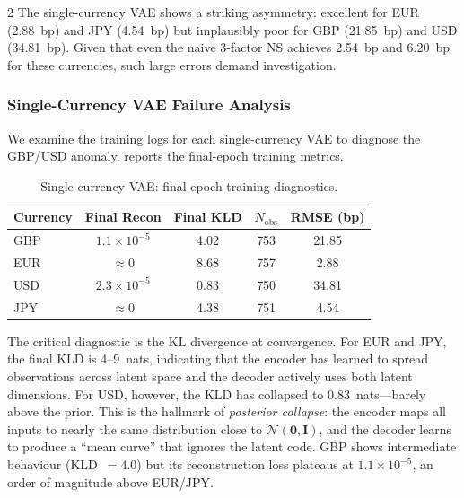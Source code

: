 \documentclass[10pt,a4paper]{article}
\theoremstyle{plain}
\theoremstyle{definition}
\begin{document}
\begin{multicols}{2}
The single-currency VAE shows a striking asymmetry: excellent for EUR (2.88~bp) and JPY (4.54~bp) but implausibly poor for GBP (21.85~bp) and USD (34.81~bp). Given that even the naive 3-factor NS achieves 2.54~bp and 6.20~bp for these currencies, such large errors demand investigation.

\subsubsection{Single-Currency VAE Failure Analysis}\label{sec:sc_failure}

We examine the training logs for each single-currency VAE to diagnose the GBP/USD anomaly.  reports the final-epoch training metrics.

\begin{table}[H]
\centering
\caption{Single-currency VAE: final-epoch training diagnostics.}\label{tab:sc_convergence}
\begin{tabular}{lcccc}
\toprule
Currency & Final Recon & Final KLD & $N_{\text{obs}}$ & RMSE (bp) \\
\midrule
GBP & $1.1 \times 10^{-5}$ & 4.02 & 753 & 21.85 \\
EUR & $\approx 0$ & 8.68 & 757 & 2.88 \\
USD & $2.3 \times 10^{-5}$ & 0.83 & 750 & 34.81 \\
JPY & $\approx 0$ & 4.38 & 751 & 4.54 \\
\bottomrule
\end{tabular}
\end{table}

The critical diagnostic is the KL divergence at convergence. For EUR and JPY, the final KLD is 4--9~nats, indicating that the encoder has learned to spread observations across latent space and the decoder actively uses both latent dimensions. For USD, however, the KLD has collapsed to 0.83~nats---barely above the prior. This is the hallmark of \textit{posterior collapse}: the encoder maps all inputs to nearly the same distribution close to $\mathcal{N}(\mathbf{0}, \mathbf{I})$, and the decoder learns to produce a ``mean curve'' that ignores the latent code. GBP shows intermediate behaviour (KLD~$= 4.0$) but its reconstruction loss plateaus at $1.1 \times 10^{-5}$, an order of magnitude above EUR/JPY.


\end{multicols}
\end{document}
